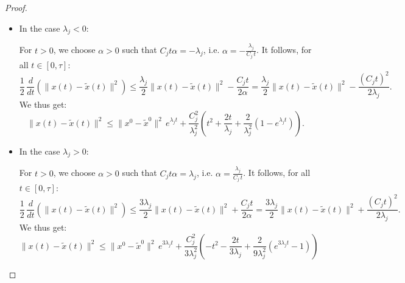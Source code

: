 \begin{proof}
\begin{itemize}
 \item In the case $\lambda_j <0$:




For $t>0$, we choose $ \alpha >0$ such that
$C_j t \alpha  = -\lambda_j$, %
i.e.
$ \alpha  = -\frac{\lambda_j}{C_j\, t}$.
It follows, for all $t\in [0,\tau]$:
\[
\frac{1}{2}\, \frac{d}{dt}(\|x(t)-\tilde x(t)\|^2) \leq
\frac{\lambda_j}{2} \|x(t)-\tilde x(t)\|^2 - \frac{C_j t}{2 \alpha }
=\frac{\lambda_j}{2} \|x(t)-\tilde x(t)\|^2 - \frac{(C_j t)^2}{2\lambda_j}.
\]
We thus get:
%
\[
\|x(t)-\tilde x(t)\|^2 \leq \|x^0-\tilde x^0\|^2\, e^{\lambda_j t}
+ \frac{C_j^2}{\lambda_j^2}\left(t^2+\frac{2 t}{\lambda_j}+\frac{2}{\lambda_j^2}\left(1- e^{\lambda_j t} \right)\right).
\]

 
%

 
 \item In the case $\lambda_j >0$:
 
For $t>0$, we choose $ \alpha >0$ such that
$C_j t \alpha  = \lambda_j$, %
i.e.
$ \alpha  = \frac{\lambda_j}{C_j\, t}$.
It follows, for all $t\in [0,\tau]$:
\[
\frac{1}{2}\, \frac{d}{dt}(\|x(t)-\tilde x(t)\|^2) \leq
\frac{3\lambda_j}{2} \|x(t)-\tilde x(t)\|^2 + \frac{C_j t}{2 \alpha }
=\frac{3\lambda_j}{2} \|x(t)-\tilde x(t)\|^2 + \frac{(C_j t)^2}{2\lambda_j}.
\]
We thus get:
%
\[
\|x(t)-\tilde x(t)\|^2 \leq \|x^0-\tilde x^0\|^2\, e^{3\lambda_j t}+
\frac{C_j^2}{3\lambda_j^2}\left(-t^2-\frac{2t}{3\lambda_j}+\frac{2}{9\lambda_j^2}
\left(e^{3\lambda_j t}-1\right)\right)\]


 

\end{itemize}
\end{proof}
